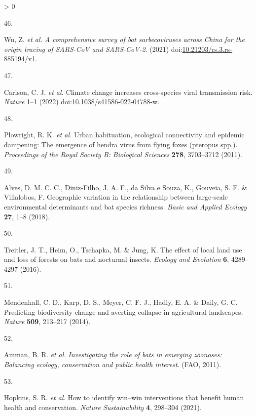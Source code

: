 \documentclass[10pt,oneside]{article}
\newlength{\cslhangindent}
\newlength{\csllabelwidth}
\newenvironment{CSLReferences}[3] %
 {%
  \setlength{\parindent}{0pt}
  \ifodd #1 \everypar{\setlength{\hangindent}{\cslhangindent}}\ignorespaces\fi
  \ifnum #2 > 0
  \setlength{\parskip}{#2\baselineskip}
  \fi
 }%
 {}
\newcommand{\CSLLeftMargin}[1]{\parbox[t]{\maxof{\widthof{#1}}{\csllabelwidth}}{#1}}
\newcommand{\CSLRightInline}[1]{\parbox[t]{\linewidth}{#1}}
\begin{document}
\begin{CSLReferences}{0}{0}
\leavevmode\hypertarget{ref-Wu2021Comprehensive}{}%
\CSLLeftMargin{46. }
\CSLRightInline{Wu, Z. \emph{et al.} \emph{A comprehensive survey of bat
sarbecoviruses across China for the origin tracing of SARS-CoV and
SARS-CoV-2}. (2021)
doi:\href{https://doi.org/10.21203/rs.3.rs-885194/v1}{10.21203/rs.3.rs-885194/v1}.}

\leavevmode\hypertarget{ref-Carlson2022Climate}{}%
\CSLLeftMargin{47. }
\CSLRightInline{Carlson, C. J. \emph{et al.} Climate change increases
cross-species viral transmission risk. \emph{Nature} 1--1 (2022)
doi:\href{https://doi.org/10.1038/s41586-022-04788-w}{10.1038/s41586-022-04788-w}.}

\leavevmode\hypertarget{ref-Plowright2011Urban}{}%
\CSLLeftMargin{48. }
\CSLRightInline{Plowright, R. K. \emph{et al.} Urban habituation,
ecological connectivity and epidemic dampening: The emergence of hendra
virus from flying foxes (pteropus spp.). \emph{Proceedings of the Royal
Society B: Biological Sciences} \textbf{278}, 3703--3712 (2011).}

\leavevmode\hypertarget{ref-Alves2018Geographic}{}%
\CSLLeftMargin{49. }
\CSLRightInline{Alves, D. M. C. C., Diniz-Filho, J. A. F., da Silva e
Souza, K., Gouveia, S. F. \& Villalobos, F. Geographic variation in the
relationship between large-scale environmental determinants and bat
species richness. \emph{Basic and Applied Ecology} \textbf{27}, 1--8
(2018).}

\leavevmode\hypertarget{ref-Treitler2016Effect}{}%
\CSLLeftMargin{50. }
\CSLRightInline{Treitler, J. T., Heim, O., Tschapka, M. \& Jung, K. The
effect of local land use and loss of forests on bats and nocturnal
insects. \emph{Ecology and Evolution} \textbf{6}, 4289--4297 (2016).}

\leavevmode\hypertarget{ref-Mendenhall2014Predictinga}{}%
\CSLLeftMargin{51. }
\CSLRightInline{Mendenhall, C. D., Karp, D. S., Meyer, C. F. J., Hadly,
E. A. \& Daily, G. C. Predicting biodiversity change and averting
collapse in agricultural landscapes. \emph{Nature} \textbf{509},
213--217 (2014).}

\leavevmode\hypertarget{ref-Amman2011Investigating}{}%
\CSLLeftMargin{52. }
\CSLRightInline{Amman, B. R. \emph{et al.} \emph{Investigating the role
of bats in emerging zoonoses: Balancing ecology, conservation and public
health interest}. (FAO, 2011).}

\leavevmode\hypertarget{ref-Hopkins2021How}{}%
\CSLLeftMargin{53. }
\CSLRightInline{Hopkins, S. R. \emph{et al.} How to identify win--win
interventions that benefit human health and conservation. \emph{Nature
Sustainability} \textbf{4}, 298--304 (2021).}


\end{CSLReferences}
\end{document}
